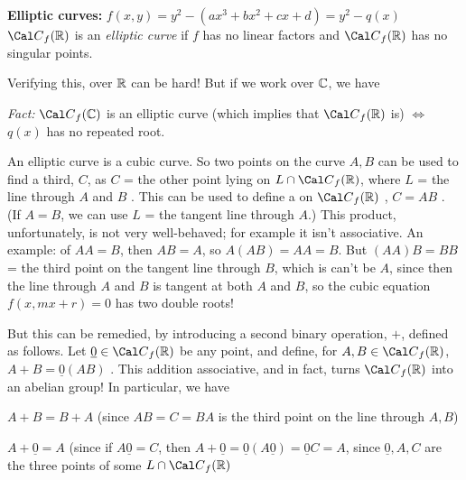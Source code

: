 
\ssk


\msk

{\bf Elliptic curves:} $f(x,y) = y^2-(ax^3+bx^2+cx+d) = y^2-q(x)$
${\Cal C}_f({\Bbb R})$ is an {\it elliptic curve} if $f$ has no linear factors
and ${\Cal C}_f({\Bbb R})$ has no singular points. 

\ssk

Verifying this, over ${\Bbb R}$ can be hard! But if we work over ${\Bbb C}$, we have


\ssk

{\it Fact:} ${\Cal C}_f({\Bbb C})$ is an elliptic curve (which implies that
${\Cal C}_f({\Bbb R})$ is) $\Leftrightarrow$ $q(x)$ has no repeated root.

\ssk

An elliptic curve is a cubic curve. So two points on the curve $A,B$ can be used
to find a third, $C$, as $C$ = the other point lying on $L\cap{\Cal C}_f({\Bbb R})$,
where $L$ = the line through $A$ and $B$ . This can be used to define a 
 on ${\Cal C}_f({\Bbb R})$ , $C=AB$ . (If $A=B$, we
can use $L$ = the tangent line through $A$.) This product, unfortunately, is not
very well-behaved; for example it isn't associative. An example: of $AA=B$, then 
$AB=A$, so $A(AB) = AA = B$. But $(AA)B = BB$ = the third point on the tangent
line through $B$, which is can't be $A$, since then the line through $A$ and $B$
is tangent at both $A$ and $B$, so the cubic equation $f(x,mx+r)=0$ has
two double roots!

\msk

But this can be remedied, by introducing a second binary operation, $+$, defined
as follows. Let $\underline{0}\in {\Cal C}_f({\Bbb R})$ be any point, and define,
for $A,B\in {\Cal C}_f({\Bbb R})$, $A+B = \underline{0}(AB)$ . This addition
 associative, and in fact, turns ${\Cal C}_f({\Bbb R})$ into an 
abelian group! In particular, we have

\ssk

$A+B=B+A$ (since $AB = C = BA$ is the third point on the line through $A,B$)

\ssk

$A+\underline{0} = A$ (since if 
$A\underline{0} = C$, then $A+\underline{0} = \underline{0}(A\underline{0}) = 
\underline{0}C = A$, since $\underline{0},A,C$ are the three points of some 
$L\cap{\Cal C}_f({\Bbb R})$

